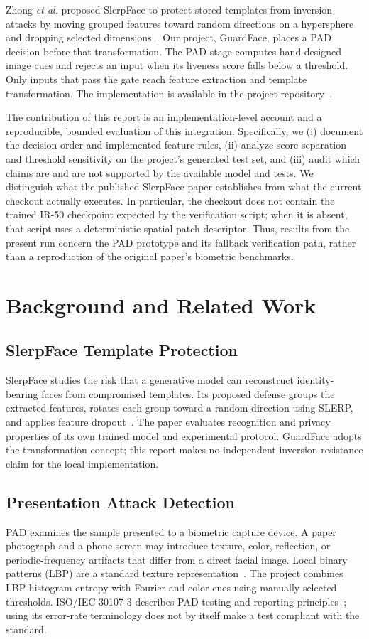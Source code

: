 \documentclass[conference,10pt]{IEEEtran}
\begin{document}
Zhong \emph{et al.} proposed SlerpFace to protect stored templates from inversion attacks by moving grouped features toward random directions on a hypersphere and dropping selected dimensions~\cite{slerpface}. Our project, GuardFace, places a PAD decision before that transformation. The PAD stage computes hand-designed image cues and rejects an input when its liveness score falls below a threshold. Only inputs that pass the gate reach feature extraction and template transformation. The implementation is available in the project repository~\cite{guardfacecode}.

The contribution of this report is an implementation-level account and a reproducible, bounded evaluation of this integration. Specifically, we (i) document the decision order and implemented feature rules, (ii) analyze score separation and threshold sensitivity on the project's generated test set, and (iii) audit which claims are and are not supported by the available model and tests. We distinguish what the published SlerpFace paper establishes from what the current checkout actually executes. In particular, the checkout does not contain the trained IR-50 checkpoint expected by the verification script; when it is absent, that script uses a deterministic spatial patch descriptor. Thus, results from the present run concern the PAD prototype and its fallback verification path, rather than a reproduction of the original paper's biometric benchmarks.

\section{Background and Related Work}
\subsection{SlerpFace Template Protection}
SlerpFace studies the risk that a generative model can reconstruct identity-bearing faces from compromised templates. Its proposed defense groups the extracted features, rotates each group toward a random direction using SLERP, and applies feature dropout~\cite{slerpface}. The paper evaluates recognition and privacy properties of its own trained model and experimental protocol. GuardFace adopts the transformation concept; this report makes no independent inversion-resistance claim for the local implementation.

\subsection{Presentation Attack Detection}
PAD examines the sample presented to a biometric capture device. A paper photograph and a phone screen may introduce texture, color, reflection, or periodic-frequency artifacts that differ from a direct facial image. Local binary patterns (LBP) are a standard texture representation~\cite{ojala}. The project combines LBP histogram entropy with Fourier and color cues using manually selected thresholds. ISO/IEC 30107-3 describes PAD testing and reporting principles~\cite{iso30107}; using its error-rate terminology does not by itself make a test compliant with the standard.
\end{document}
